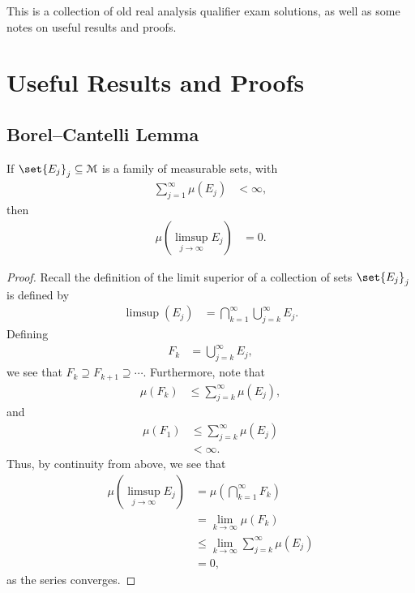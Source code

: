 \documentclass[10pt]{mypackage}
\begin{document}
\RaggedRight
This is a collection of old real analysis qualifier exam solutions, as well as some notes on useful results and proofs.
\section{Useful Results and Proofs}%
\subsection{Borel--Cantelli Lemma}%
\begin{theorem}
  If $\set{E_j}_j\subseteq \mathcal{M}$ is a family of measurable sets, with
  \begin{align*}
    \sum_{j=1}^{\infty}\mu\left( E_j \right) &< \infty,
  \end{align*}
  then
  \begin{align*}
    \mu\left( \limsup_{j\rightarrow\infty}E_j \right) &= 0.
  \end{align*}
\end{theorem}
\begin{proof}
  Recall the definition of the limit superior of a collection of sets $\set{E_j}_j$ is defined by
  \begin{align*}
    \limsup\left( E_j \right) &= \bigcap_{k=1}^{\infty}\bigcup_{j=k}^{\infty} E_j.
  \end{align*}
  Defining
  \begin{align*}
    F_k &= \bigcup_{j=k}^{\infty} E_j,
  \end{align*}
  we see that $F_k \supseteq F_{k+1}\supseteq \cdots$. Furthermore, note that
  \begin{align*}
    \mu\left( F_k \right) &\leq \sum_{j=k}^{\infty} \mu\left( E_j \right),
  \end{align*}
  and
  \begin{align*}
    \mu\left( F_1 \right) &\leq \sum_{j=k}^{\infty}\mu\left( E_j \right)\\
                          &< \infty.
  \end{align*}
  Thus, by continuity from above, we see that
  \begin{align*}
    \mu\left( \limsup_{j\rightarrow\infty} E_j \right) &= \mu\left( \bigcap_{k=1}^{\infty}F_k \right)\\
                                                       &= \lim_{k\rightarrow\infty}\mu\left( F_k \right)\\
                                                       &\leq \lim_{k\rightarrow\infty}\sum_{j=k}^{\infty} \mu\left( E_j \right)\\
                                                       &= 0,
  \end{align*}
  as the series converges.
\end{proof}
\end{document}
